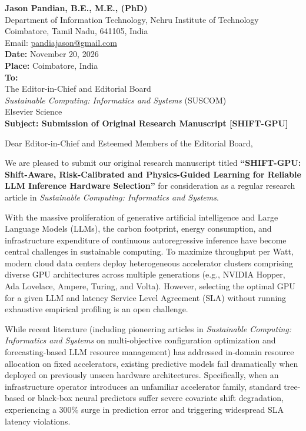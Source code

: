 \documentclass[11pt]{article}
\begin{document}
\noindent
\textbf{Jason Pandian, B.E., M.E., (PhD)}\\
Department of Information Technology, Nehru Institute of Technology\\
Coimbatore, Tamil Nadu, 641105, India\\
Email: \url{pandiajason@gmail.com}\\[1em]
\textbf{Date:} November 20, 2026\\
\textbf{Place:} Coimbatore, India\\[1em]
\textbf{To:}\\
The Editor-in-Chief and Editorial Board\\
\textit{Sustainable Computing: Informatics and Systems} (SUSCOM)\\
Elsevier Science\\[1em]
\textbf{Subject: Submission of Original Research Manuscript [SHIFT-GPU]}

\vspace{1em}
\noindent
Dear Editor-in-Chief and Esteemed Members of the Editorial Board,

We are pleased to submit our original research manuscript titled \textbf{``SHIFT-GPU: Shift-Aware, Risk-Calibrated and Physics-Guided Learning for Reliable LLM Inference Hardware Selection''} for consideration as a regular research article in \textit{Sustainable Computing: Informatics and Systems}.

With the massive proliferation of generative artificial intelligence and Large Language Models (LLMs), the carbon footprint, energy consumption, and infrastructure expenditure of continuous autoregressive inference have become central challenges in sustainable computing. To maximize throughput per Watt, modern cloud data centers deploy heterogeneous accelerator clusters comprising diverse GPU architectures across multiple generations (e.g., NVIDIA Hopper, Ada Lovelace, Ampere, Turing, and Volta). However, selecting the optimal GPU for a given LLM and latency Service Level Agreement (SLA) without running exhaustive empirical profiling is an open challenge.

While recent literature (including pioneering articles in \textit{Sustainable Computing: Informatics and Systems} on multi-objective configuration optimization and forecasting-based LLM resource management) has addressed in-domain resource allocation on fixed accelerators, existing predictive models fail dramatically when deployed on previously unseen hardware architectures. Specifically, when an infrastructure operator introduces an unfamiliar accelerator family, standard tree-based or black-box neural predictors suffer severe covariate shift degradation, experiencing a 300\% surge in prediction error and triggering widespread SLA latency violations.
\end{document}
